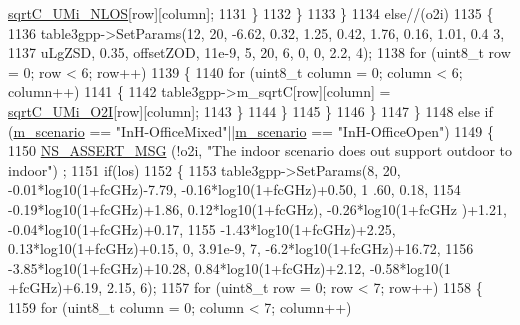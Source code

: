 \begin{DoxyCode}
      \hyperlink{namespacens3_a6fd885aaf93f9727bfb2331d67dffec7}{sqrtC\_UMi\_NLOS}[row][column];
1131                                         \}
1132                                 \}
1133                         \}
1134                         \textcolor{keywordflow}{else}\textcolor{comment}{//(o2i)}
1135                         \{
1136                                 table3gpp->SetParams(12, 20, -6.62, 0.32, 1.25, 0.42, 1.76, 0.16, 1.01, 0.4
      3,
1137                                                 uLgZSD, 0.35, offsetZOD, 11e-9, 5, 20, 6, 0, 0, 2.2, 4);
1138                                 \textcolor{keywordflow}{for} (uint8\_t row = 0; row < 6; row++)
1139                                 \{
1140                                         \textcolor{keywordflow}{for} (uint8\_t column = 0; column < 6; column++)
1141                                         \{
1142                                                 table3gpp->m\_sqrtC[row][column] = 
      \hyperlink{namespacens3_ac79a159d07651583d79482e4429cf74a}{sqrtC\_UMi\_O2I}[row][column];
1143                                         \}
1144                                 \}
1145                         \}
1146                 \}
1147         \}
1148         \textcolor{keywordflow}{else} \textcolor{keywordflow}{if} (\hyperlink{classns3_1_1MmWave3gppChannel_ae1f263fbc87682905d563221343e4447}{m\_scenario} == \textcolor{stringliteral}{"InH-OfficeMixed"}||\hyperlink{classns3_1_1MmWave3gppChannel_ae1f263fbc87682905d563221343e4447}{m\_scenario} == \textcolor{stringliteral}{"InH-OfficeOpen"})
1149         \{
1150                 \hyperlink{assert_8h_aff5ece9066c74e681e74999856f08539}{NS\_ASSERT\_MSG} (!o2i, \textcolor{stringliteral}{"The indoor scenario does out support outdoor to indoor"})
      ;
1151                 \textcolor{keywordflow}{if}(los)
1152                 \{
1153                         table3gpp->SetParams(8, 20, -0.01*log10(1+fcGHz)-7.79, -0.16*log10(1+fcGHz)+0.50, 1
      .60, 0.18,
1154                                         -0.19*log10(1+fcGHz)+1.86, 0.12*log10(1+fcGHz), -0.26*log10(1+fcGHz
      )+1.21, -0.04*log10(1+fcGHz)+0.17,
1155                                         -1.43*log10(1+fcGHz)+2.25, 0.13*log10(1+fcGHz)+0.15, 0, 3.91e-9, 7,
       -6.2*log10(1+fcGHz)+16.72,
1156                                         -3.85*log10(1+fcGHz)+10.28, 0.84*log10(1+fcGHz)+2.12, -0.58*log10(1
      +fcGHz)+6.19, 2.15, 6);
1157                         \textcolor{keywordflow}{for} (uint8\_t row = 0; row < 7; row++)
1158                         \{
1159                                 \textcolor{keywordflow}{for} (uint8\_t column = 0; column < 7; column++)

\end{DoxyCode}
